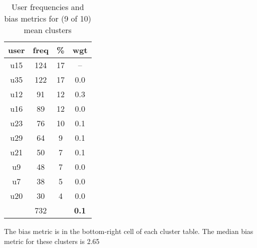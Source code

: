 \begin{table}
\begin{tabular}{ |c|c|c|c| }
	\hline
	\textbf{user} & \textbf{freq} & \textbf{\%} & \textbf{wgt} \\
	\hline
	u15 & 124 & 17 & -- \\
	u35 & 122 & 17 & 0.0 \\
	u12 & 91 & 12 & 0.3 \\
	u16 & 89 & 12 & 0.0 \\
	u23 & 76 & 10 & 0.1 \\
	u29 & 64 & 9 & 0.1 \\
	u21 & 50 & 7 & 0.1 \\
	u9 & 48 & 7 & 0.0 \\
	u7 & 38 & 5 & 0.0 \\
	u20 & 30 & 4 & 0.0 \\
	 & 732 & & \textbf{0.1} \\
	\hline
\end{tabular}
\caption{User frequencies and bias metrics for (9 of 10) mean clusters}
{\small The bias metric is in the bottom-right cell of each cluster table. The median bias metric for these clusters is 2.65}
\end{table}

